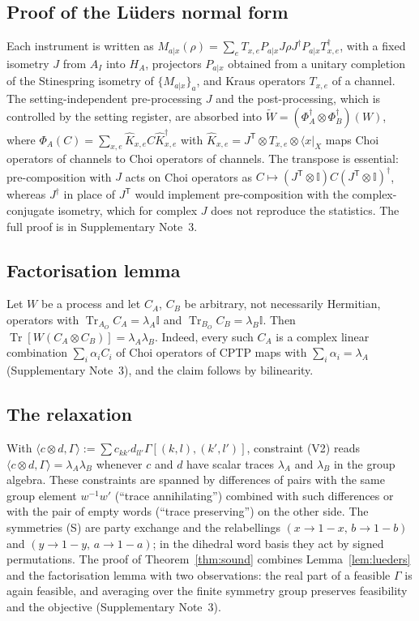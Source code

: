 \documentclass[11pt]{article}
\newcommand{\Tr}{\operatorname{Tr}}
\newcommand{\bra}[1]{\langle #1\rvert}
\newcommand{\one}{\mathbb{I}}
\newcommand{\tp}{\mathsf{T}}
\begin{document}
\subsection*{Proof of the L\"uders normal form}
Each instrument is written as $M_{a|x}(\rho)=\sum_eT_{x,e}P_{a|x}J\rho J^\dagger P_{a|x}T_{x,e}^\dagger$, with a fixed isometry $J$ from $A_I$ into $H_A$, projectors $P_{a|x}$ obtained from a unitary completion of the Stinespring isometry of $\{M_{a|x}\}_a$, and Kraus operators $T_{x,e}$ of a channel. The setting-independent pre-processing $J$ and the post-processing, which is controlled by the setting register, are absorbed into $\widetilde W=(\Phi_A^\dagger\otimes\Phi_B^\dagger)(W)$, where $\Phi_A(C)=\sum_{x,e}\hat K_{x,e}C\hat K_{x,e}^\dagger$ with $\hat K_{x,e}=J^\tp\otimes T_{x,e}\otimes\bra{x}_X$ maps Choi operators of channels to Choi operators of channels. The transpose is essential: pre-composition with $J$ acts on Choi operators as $C\mapsto(J^\tp\otimes\one)C(J^\tp\otimes\one)^\dagger$, whereas $J^\dagger$ in place of $J^\tp$ would implement pre-composition with the complex-conjugate isometry, which for complex $J$ does not reproduce the statistics. The full proof is in Supplementary Note~3.

\subsection*{Factorisation lemma}
Let $W$ be a process and let $C_A$, $C_B$ be arbitrary, not necessarily Hermitian, operators with $\Tr_{A_O}C_A=\lambda_A\one$ and $\Tr_{B_O}C_B=\lambda_B\one$. Then $\Tr[W(C_A\otimes C_B)]=\lambda_A\lambda_B$. Indeed, every such $C_A$ is a complex linear combination $\sum_i\alpha_iC_i$ of Choi operators of CPTP maps with $\sum_i\alpha_i=\lambda_A$ (Supplementary Note~3), and the claim follows by bilinearity.

\subsection*{The relaxation}
With $\langle c\otimes d,\Gamma\rangle:=\sum c_{kk'}d_{ll'}\Gamma[(k,l),(k',l')]$, constraint (V2) reads $\langle c\otimes d,\Gamma\rangle=\lambda_A\lambda_B$ whenever $c$ and $d$ have scalar traces $\lambda_A$ and $\lambda_B$ in the group algebra. These constraints are spanned by differences of pairs with the same group element $w^{-1}w'$ (``trace annihilating'') combined with such differences or with the pair of empty words (``trace preserving'') on the other side. The symmetries (S) are party exchange and the relabellings $(x\to1-x,\,b\to1-b)$ and $(y\to1-y,\,a\to1-a)$; in the dihedral word basis they act by signed permutations. The proof of Theorem~\ref{thm:sound} combines Lemma~\ref{lem:lueders} and the factorisation lemma with two observations: the real part of a feasible $\Gamma$ is again feasible, and averaging over the finite symmetry group preserves feasibility and the objective (Supplementary Note~3).
\end{document}
